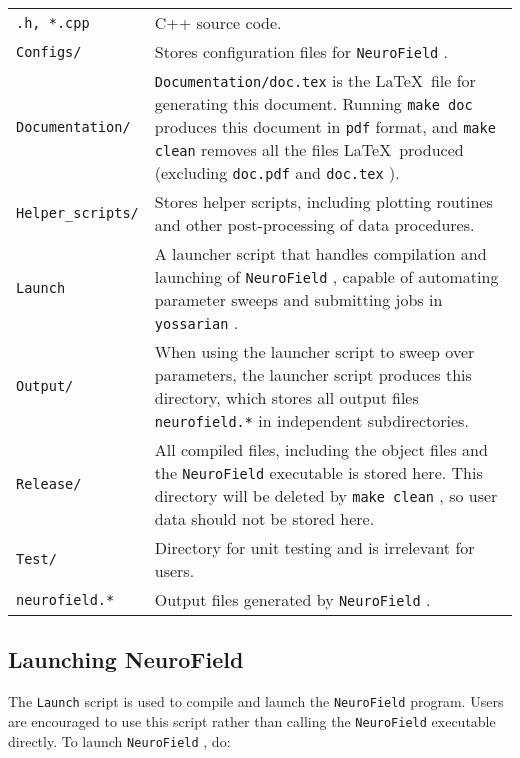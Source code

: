 \documentclass[12pt,a4paper]{article}
\newcommand{\type}[1]{ {\small\small\tt #1} }
\newcommand{\NF}[0]{ \type{NeuroField}}
\begin{document}
\begin{tabular}{l p{12cm}}
\type{*.h, *.cpp}& C++ source code.\\
\type{Configs/}& Stores configuration files for \NF.\\
\type{Documentation/}& \type{Documentation/doc.tex} is the \LaTeX\ file for generating this document. Running \type{make doc} produces this document in \type{pdf} format, and \type{make clean} removes all the files \LaTeX\ produced (excluding \type{doc.pdf} and \type{doc.tex}).\\
\type{Helper\_scripts/}& Stores helper scripts, including plotting routines and other post-processing of data procedures.\\
\type{Launch}& A launcher script that handles compilation and launching of \NF, capable of automating parameter sweeps and submitting jobs in \type{yossarian}.\\
\type{Output/}& When using the launcher script to sweep over parameters, the launcher script produces this directory, which stores all output files \type{neurofield.*} in independent subdirectories.\\
\type{Release/}& All compiled files, including the object files and the \NF executable is stored here. This directory will be deleted by \type{make clean}, so user data should not be stored here.\\
\type{Test/}& Directory for unit testing and is irrelevant for users.\\
\type{neurofield.*}& Output files generated by \NF.
\end{tabular}

\subsection{Launching NeuroField}
\label{sec:launch}

The \type{Launch} script is used to compile and launch the \NF program. Users are encouraged to use this script rather than calling the \NF executable directly. To launch \NF, do:
\end{document}
